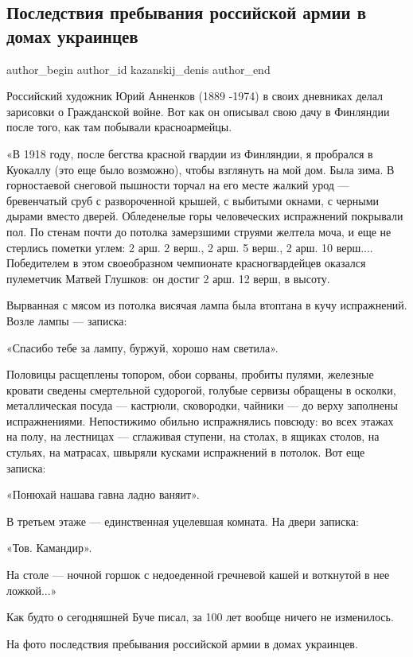  
 
 
 
 
 
\subsection{Последствия пребывания российской армии в домах украинцев}
\label{sec:12_04_2022.fb.kazanskij_denis.1.rosarmia_doma_ukraincev}
 
\ifcmt
 author_begin
   author_id kazanskij_denis
 author_end
\fi

Российский художник Юрий Анненков (1889 -1974) в своих дневниках делал
зарисовки о Гражданской войне. Вот как он описывал свою дачу в Финляндии после
того, как там побывали красноармейцы. 


«В 1918 году, после бегства красной гвардии из Финляндии, я пробрался в
Куокаллу (это еще было возможно), чтобы взглянуть на мой дом. Была зима. В
горностаевой снеговой пышности торчал на его месте жалкий урод — бревенчатый
сруб с развороченной крышей, с выбитыми окнами, с черными дырами вместо дверей.
Обледенелые горы человеческих испражнений покрывали пол. По стенам почти до
потолка замерзшими струями желтела моча, и еще не стерлись пометки углем: 2
арш. 2 верш., 2 арш. 5 верш., 2 арш. 10 верш.... Победителем в этом
своеобразном чемпионате красногвардейцев оказался пулеметчик Матвей Глушков: он
достиг 2 арш. 12 верш, в высоту.

Вырванная с мясом из потолка висячая лампа была втоптана в кучу испражнений.
Возле лампы — записка:

«Спасибо тебе за лампу, буржуй, хорошо нам светила».

Половицы расщеплены топором, обои сорваны, пробиты пулями, железные кровати
сведены смертельной судорогой, голубые сервизы обращены в осколки,
металлическая посуда — кастрюли, сковородки, чайники — до верху заполнены
испражнениями. Непостижимо обильно испражнялись повсюду: во всех этажах на
полу, на лестницах — сглаживая ступени, на столах, в ящиках столов, на стульях,
на матрасах, швыряли кусками испражнений в потолок. Вот еще записка:

«Понюхай нашава гавна ладно ваняит».

В третьем этаже — единственная уцелевшая комната. На двери записка:

«Тов. Камандир».

На столе — ночной горшок с недоеденной гречневой кашей и воткнутой в нее
ложкой...»

Как будто о сегодняшней Буче писал, за 100 лет вообще ничего не изменилось. 

На фото последствия пребывания российской армии в домах украинцев.
